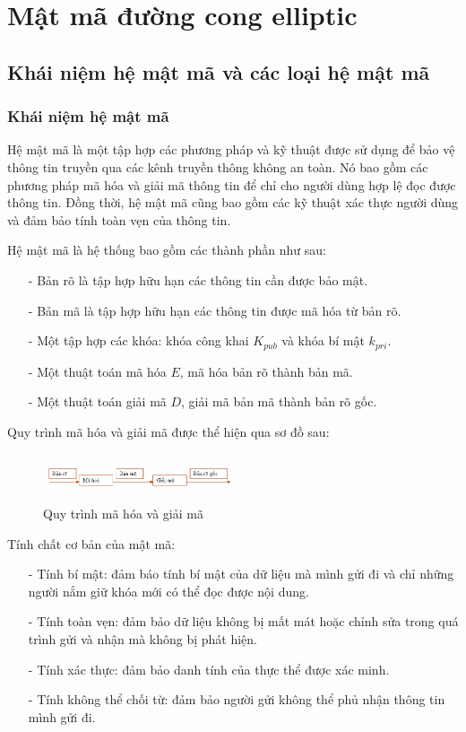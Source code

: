 \section{Mật mã đường cong elliptic}
\subsection{Khái niệm hệ mật mã và các loại hệ mật mã}

\subsubsection{Khái niệm hệ mật mã}
Hệ mật mã là một tập hợp các phương pháp và kỹ thuật được sử dụng để 
bảo vệ thông tin truyền qua các kênh truyền thông không an toàn. Nó 
bao gồm các phương pháp mã hóa và giải mã thông tin để chỉ cho người 
dùng hợp lệ đọc được thông tin. Đồng thời, hệ mật mã cũng bao gồm các 
kỹ thuật xác thực người dùng và đảm bảo tính toàn vẹn của thông tin.

Hệ mật mã là hệ thống bao gồm các thành phần như sau:
\begin{itemize}
    \item[-] Bản rõ là tập hợp hữu hạn các thông tin cần được bảo mật.
    \item[-] Bản mã là tập hợp hữu hạn các thông tin được mã hóa từ bản rõ.
    \item[-] Một tập hợp các khóa: khóa công khai $K_{pub}$ và khóa bí mật $k_{pri}$.
    \item[-] Một thuật toán mã hóa $E$, mã hóa bản rõ thành bản mã.
    \item[-] Một thuật toán giải mã $D$, giải mã bản mã thành bản rõ gốc.
\end{itemize}

Quy trình mã hóa và giải mã được thể hiện qua sơ đồ sau:
\begin{figure}[h]
    \centering
    \includegraphics[width=0.5\textwidth]{images/encrypt-decrypt.png}
    \caption{Quy trình mã hóa và giải mã}
    \label{fig:encrypt-decrypt}
\end{figure}

Tính chất cơ bản của mật mã:
\begin{itemize}
    \item[-] Tính bí mật: đảm báo tính bí mật của dữ liệu mà mình gửi đi và
        chỉ những người nắm giữ khóa mới có thể đọc được nội dung.
    \item[-] Tính toàn vẹn: đảm bảo dữ liệu không bị mất mát hoặc chỉnh sửa 
    trong quá trình gửi và nhận mà không bị phát hiện.
    \item[-] Tính xác thực: đảm bảo danh tính của thực thể được xác minh.
    \item[-] Tính không thể chối từ:  đảm bảo người gửi không thể phủ nhận
    thông tin mình gửi đi.
\end{itemize}


